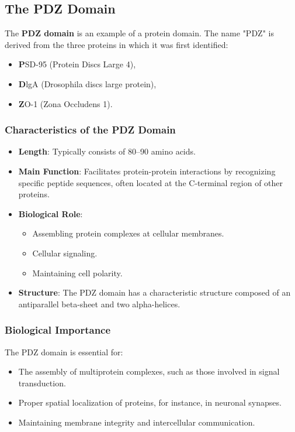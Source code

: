 \documentclass[English, Lau, oneside]{sapthesis}
\begin{document}
\subsection*{The PDZ Domain}
The \textbf{PDZ domain} is an example of a protein domain. The name "PDZ" is derived from the three proteins in which it was first identified:
\begin{itemize}
    \item \textbf{P}SD-95 (Protein Discs Large 4),
    \item \textbf{D}lgA (Drosophila discs large protein),
    \item \textbf{Z}O-1 (Zona Occludens 1).
\end{itemize}

\subsubsection*{Characteristics of the PDZ Domain}
\begin{itemize}
    \item \textbf{Length}: Typically consists of 80--90 amino acids.
    \item \textbf{Main Function}: Facilitates protein-protein interactions by recognizing specific peptide sequences, often located at the C-terminal region of other proteins.
    \item \textbf{Biological Role}:
    \begin{itemize}
        \item Assembling protein complexes at cellular membranes.
        \item Cellular signaling.
        \item Maintaining cell polarity.
    \end{itemize}
    \item \textbf{Structure}: The PDZ domain has a characteristic structure composed of an antiparallel beta-sheet and two alpha-helices.
\end{itemize}

\subsubsection*{Biological Importance}
The PDZ domain is essential for:
\begin{itemize}
    \item The assembly of multiprotein complexes, such as those involved in signal transduction.
    \item Proper spatial localization of proteins, for instance, in neuronal synapses.
    \item Maintaining membrane integrity and intercellular communication.
\end{itemize}
\end{document}
